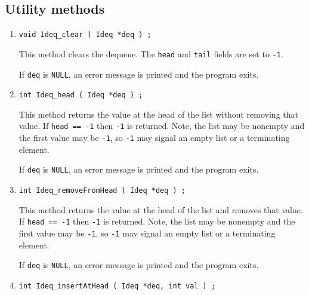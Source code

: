 \subsection{Utility methods}
\label{subsection:Ideq:proto:utilities}
\par
\begin{enumerate}
\item
\begin{verbatim}
void Ideq_clear ( Ideq *deq ) ;
\end{verbatim}
This method clears the dequeue. 
The {\tt head} and {\tt tail} fields are set to {\tt -1}.
\par {}
If {\tt deq} is {\tt NULL},
an error message is printed and the program exits.
\item
\begin{verbatim}
int Ideq_head ( Ideq *deq ) ;
\end{verbatim}
This method returns the value at the head of the list without
removing that value.
If {\tt head == -1} then {\tt -1} is returned.
Note, the list may be nonempty and the first value may be {\tt -1},
so {\tt -1} may signal an empty list or a terminating element.
\par {}
If {\tt deq} is {\tt NULL},
an error message is printed and the program exits.
\item
\begin{verbatim}
int Ideq_removeFromHead ( Ideq *deq ) ;
\end{verbatim}
This method returns the value at the head of the list and
removes that value.
If {\tt head == -1} then {\tt -1} is returned.
Note, the list may be nonempty and the first value may be {\tt -1},
so {\tt -1} may signal an empty list or a terminating element.
\par {}
If {\tt deq} is {\tt NULL},
an error message is printed and the program exits.
\item
\begin{verbatim}
int Ideq_insertAtHead ( Ideq *deq, int val ) ;

\end{verbatim}
\end{enumerate}
